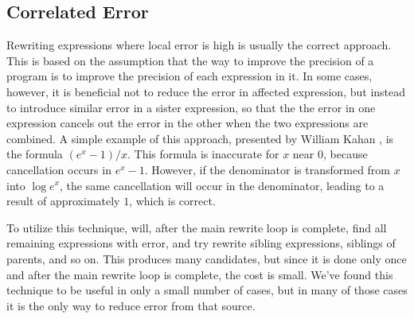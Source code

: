 \documentclass[paper.tex]{subfiles}
\begin{document}
\subsection{Correlated Error}

Rewriting expressions where local error is high
  is usually the correct approach.
This is based on the assumption
  that the way to improve the precision of a program
  is to improve the precision of each expression in it.
In some cases, however, it is beneficial not to reduce the error in affected expression,
  but instead to introduce similar error in a sister expression,
  so that the the error in one expression
  cancels out the error in the other
  when the two expressions are combined.
A simple example of this approach,
  presented by William Kahan ,
  is the formula $(e^x - 1) / x$.
This formula is inaccurate for $x$ near $0$,
  because cancellation occurs in $e^x - 1$.
However, if the denominator is transformed from $x$ into $\log e^x$,
  the same cancellation will occur in the denominator,
  leading to a result of approximately $1$, which is correct.

To utilize this technique,
  \casio will, after the main rewrite loop is complete,
  find all remaining expressions with error,
  and try rewrite sibling expressions, siblings of parents, and so on.
This produces many candidates, but since it is done only once
  and after the main rewrite loop is complete, the cost is small.
We've found this technique to be useful in only a small number of cases,
  but in many of those cases it is the only way to reduce error from that source.
\end{document}
